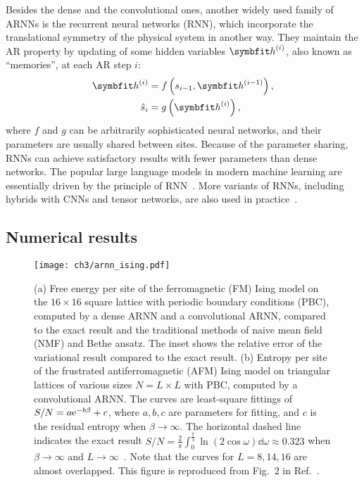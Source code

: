 Besides the dense and the convolutional ones, another widely used family of ARNNs is the recurrent neural networks (RNN), which incorporate the translational symmetry of the physical system in another way. They maintain the AR property by updating of some hidden variables $\vh^{(i)}$, also known as ``memories'', at each AR step $i$:
\begin{align}
\vh^{(i)} &= f\left( s_{i - 1}, \vh^{(i - 1)} \right), \\
\hat{s}_i &= g\left( \vh^{(i)} \right),
\end{align}
where $f$ and $g$ can be arbitrarily sophisticated neural networks, and their parameters are usually shared between sites. Because of the parameter sharing, RNNs can achieve satisfactory results with fewer parameters than dense networks. The popular large language models in modern machine learning are essentially driven by the principle of RNN~\cite{brown2020language}. More variants of RNNs, including hybrids with CNNs and tensor networks, are also used in practice~\cite{oord2016pixel, khandoker2023supplementing}.

\subsection{Numerical results}

\begin{figure}[htb]
\centering
\texttt{[image: ch3/arnn\_ising.pdf]}
\caption[ARNN results of Ising model on square and triangular lattices]{
(a) Free energy per site of the ferromagnetic (FM) Ising model on the $16 \times 16$ square lattice with periodic boundary conditions (PBC), computed by a dense ARNN and a convolutional ARNN, compared to the exact result and the traditional methods of naive mean field (NMF) and Bethe ansatz.
The inset shows the relative error of the variational result compared to the exact result.
(b) Entropy per site of the frustrated antiferromagnetic (AFM) Ising model on triangular lattices of various sizes $N = L \times L$ with PBC, computed by a convolutional ARNN.
The curves are least-square fittings of $S / N = a \mathrm{e}^{-b \beta} + c$, where $a, b, c$ are parameters for fitting, and $c$ is the residual  entropy when $\beta \to \infty$.
The horizontal dashed line indicates the exact result $S / N = \frac{2}{\pi} \int_0^{\frac{\pi}{3}} \ln(2 \cos \omega) \dd \omega \approx 0.323$ when $\beta \to \infty$ and $L \to \infty$~\cite{wannier1950antiferromagnetism, wannier1973antiferromagnetism}.
Note that the curves for $L = 8, 14, 16$ are almost overlapped.
This figure is reproduced from Fig.~2 in Ref.~\cite{wu2019solving}.
}
\label{fig:arnn-ising}
\end{figure}

